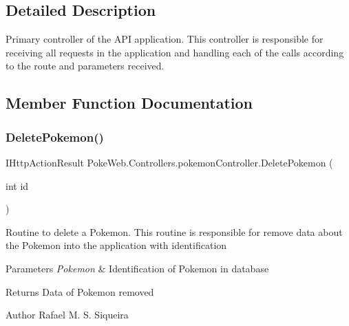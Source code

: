 \subsection{Detailed Description}
Primary controller of the A\+PI application. This controller is responsible for receiving all requests in the application and handling each of the calls according to the route and parameters received. 

\subsection{Member Function Documentation}
\mbox{\label{class_poke_web_1_1_controllers_1_1pokemon_controller_a8ba6862493be8003dc42bebe58578da4}} 
\subsubsection{\texorpdfstring{Delete\+Pokemon()}{DeletePokemon()}}
{\footnotesize\ttfamily I\+Http\+Action\+Result Poke\+Web.\+Controllers.\+pokemon\+Controller.\+Delete\+Pokemon (\begin{DoxyParamCaption}\item[{int}]{id }\end{DoxyParamCaption})\hspace{0.3cm}{\ttfamily [inline]}}

Routine to delete a Pokemon. This routine is responsible for remove data about the Pokemon into the application with identification


\begin{DoxyParams}{Parameters}
{\em Pokemon} & Identification of Pokemon in database \\
\hline
\end{DoxyParams}
\begin{DoxyReturn}{Returns}
Data of Pokemon removed 
\end{DoxyReturn}
\begin{DoxyAuthor}{Author}
Rafael M. S. Siqueira 
\end{DoxyAuthor}
\mbox{\label{class_poke_web_1_1_controllers_1_1pokemon_controller_a5d8946d4d1cbf4cb9b044ef2e7cb7492}} 
